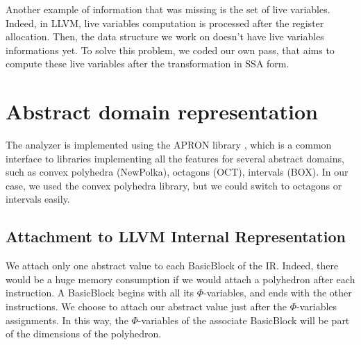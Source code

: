 \documentclass[a4paper,english,titlepage,11pt]{report}
\begin{document}
Another example of information that was missing is the set of live variables.
Indeed, in LLVM, live variables computation is processed after the register
allocation. Then, the data structure we work on doesn't have live variables
informations yet. To solve this problem, we coded our own pass, that aims to
compute these live variables after the transformation in SSA form.

 \section{Abstract domain representation}

	The analyzer is implemented using the APRON library \cite{JM09}, which
	is a common interface to libraries implementing all the features
	for several abstract domains, such as convex polyhedra (NewPolka), 
	octagons (OCT), intervals (BOX).
	In our case, we used the convex polyhedra library, but we could switch
	to octagons or intervals easily.

	\subsection{Attachment to LLVM Internal Representation}

	We attach only one abstract value to each BasicBlock of the IR. Indeed,
	there would be a huge memory consumption if we would attach a polyhedron
	after each instruction. A BasicBlock begins with all its $\Phi$-variables,
	and ends with the other instructions. We choose to attach our abstract value
	just after the $\Phi$-variables assignments. In this way, the
	$\Phi$-variables of the associate BasicBlock will be part of the dimensions
	of the polyhedron.
\end{document}

